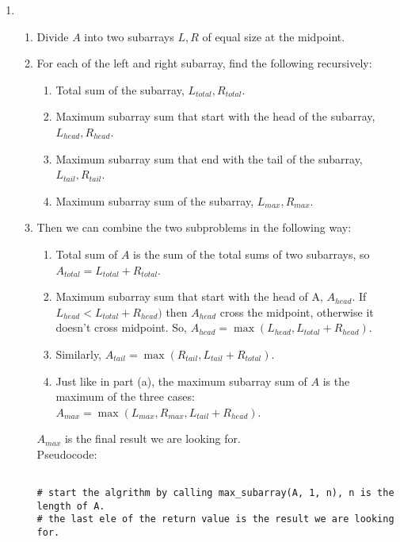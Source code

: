 \documentclass{article}
\begin{document}
\begin{enumerate}
\begin{enumerate}
        \newpage
        \item
        \begin{enumerate}
            \item Divide $A$ into two subarrays $L, R$ of equal size at the midpoint.
            \item For each of the left and right subarray, find the following recursively:
            \begin{enumerate}
                \item Total sum of the subarray, $L_{total}, R_{total}$.
                \item Maximum subarray sum that start with the head of the subarray, $L_{head}, R_{head}$.
                \item Maximum subarray sum that end with the tail of the subarray, $L_{tail}, R_{tail}$.
                \item Maximum subarray sum of the subarray, $L_{max}, R_{max}$.
            \end{enumerate}
            \item Then we can combine the two subproblems in the following way:
            \begin{enumerate}
                \item Total sum of $A$ is the sum of the total sums of two subarrays, so\\
                $A_{total} = L_{total} + R_{total}$.
                \item Maximum subarray sum that start with the head of A, $A_{head}$. 
                If $L_{head} < L_{total} + R_{head})$ then $A_{head}$ cross the midpoint, otherwise it doesn't cross midpoint. So, $A_{head} = \max(L_{head}, L_{total} + R_{head})$.
                \item Similarly, $A_{tail} = \max(R_{tail}, L_{tail} + R_{total})$.
                \item Just like in part (a), the maximum subarray sum of $A$ is the maximum of the three cases: $A_{max} = \max(L_{max}, R_{max}, L_{tail} + R_{head})$.
            \end{enumerate}
            $A_{max}$ is the final result we are looking for. \\

            Pseudocode:
            \begin{verbatim}

# start the algrithm by calling max_subarray(A, 1, n), n is the length of A.
# the last ele of the return value is the result we are looking for.


\end{verbatim}
\end{enumerate}
\end{enumerate}
\end{enumerate}
\end{document}
